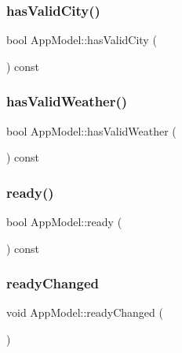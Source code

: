 \mbox{\label{class_app_model_aedeadab67d9bc5f5dfead369f66c3912}} 
\subsubsection{\texorpdfstring{has\+Valid\+City()}{hasValidCity()}}
{\footnotesize\ttfamily bool App\+Model\+::has\+Valid\+City (\begin{DoxyParamCaption}{ }\end{DoxyParamCaption}) const}

\mbox{\label{class_app_model_a6ec5b34a1839a7141979709418174ad1}} 
\subsubsection{\texorpdfstring{has\+Valid\+Weather()}{hasValidWeather()}}
{\footnotesize\ttfamily bool App\+Model\+::has\+Valid\+Weather (\begin{DoxyParamCaption}{ }\end{DoxyParamCaption}) const}

\mbox{\label{class_app_model_a3917fdc3dd8c97715991d9fd1a23abcc}} 
\subsubsection{\texorpdfstring{ready()}{ready()}}
{\footnotesize\ttfamily bool App\+Model\+::ready (\begin{DoxyParamCaption}{ }\end{DoxyParamCaption}) const}

\mbox{\label{class_app_model_a574c2bd6f5c92ac9268107f8399989cb}} 
\subsubsection{\texorpdfstring{ready\+Changed}{readyChanged}}
{\footnotesize\ttfamily void App\+Model\+::ready\+Changed (\begin{DoxyParamCaption}{ }\end{DoxyParamCaption})\hspace{0.3cm}{\ttfamily [signal]}}



